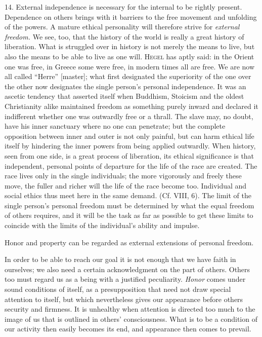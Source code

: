 \documentclass[12pt,a4paper,openany]{book}
\newcommand{\opage}[1]{\marginnote{\footnotesize\textit{[#1]}}}
\begin{document}
14. External independence is necessary for the internal to be rightly present. Dependence on others brings with it
barriers to the free movement and unfolding of the powers. A mature ethical personality will therefore strive for
\textit{external freedom.} We see, too, that the history of the world is really a great history of liberation. What
is struggled over in history is not merely the means to live, but also the means to be able to live as one will.
\textsc{Hegel} has aptly said: in the Orient one was free, in Greece some were free, in modern times all are free. We
are now all called ``Herre'' [master]; what first designated the superiority of the one over the other now
designates the single person's personal independence. It was an ascetic tendency that asserted itself when
Buddhism, Stoicism and the oldest Christianity alike maintained freedom as something purely inward and declared it
indifferent whether one was outwardly free or a thrall. The slave may, no doubt, have his inner sanctuary where no
one can penetrate; but the complete opposition between inner and outer is not only painful, but can harm ethical life
itself by hindering the inner powers from being applied outwardly. When history, seen from one side, is a great
process of liberation, its ethical significance is that independent, personal points of departure for the life of
the race are created. The race lives only in the single individuals; the more vigorously and freely these move, the
fuller and richer will the life of the race become too. Individual and social ethics thus meet here in the same
\opage{234}demand. (Cf. VIII, 6). The limit of the single person's personal freedom must be determined by what the
equal freedom of others requires, and it will be the task as far as possible to get these limits to coincide with
the limits of the individual's ability and impulse.

Honor and property can be regarded as external extensions of personal freedom.

In order to be able to reach our goal it is not enough that we have faith in ourselves; we also need a certain
acknowledgment on the part of others. Others too must regard us as a being with a justified peculiarity.
\textit{Honor} comes under sound conditions of itself, as a presupposition that need not draw special attention to
itself, but which nevertheless gives our appearance before others security and firmness. It is unhealthy when
attention is directed too much to the image of us that is outlined in others' consciousness. What is to be a
condition of our activity then easily becomes its end, and appearance then comes to prevail.
\end{document}
